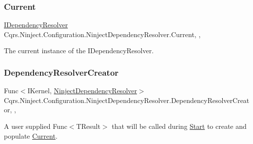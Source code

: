 \subsubsection{\texorpdfstring{Current}{Current}}
{\footnotesize\ttfamily \hyperlink{interfaceCqrs_1_1Configuration_1_1IDependencyResolver}{I\+Dependency\+Resolver} Cqrs.\+Ninject.\+Configuration.\+Ninject\+Dependency\+Resolver.\+Current\hspace{0.3cm}{\ttfamily [static]}, {\ttfamily [get]}, {}}



The current instance of the I\+Dependency\+Resolver. 

\mbox{\label{classCqrs_1_1Ninject_1_1Configuration_1_1NinjectDependencyResolver_a11ea52beeb7420d21c99baeb3501aa0a_a11ea52beeb7420d21c99baeb3501aa0a}} 
\subsubsection{\texorpdfstring{Dependency\+Resolver\+Creator}{DependencyResolverCreator}}
{\footnotesize\ttfamily Func$<$I\+Kernel, \hyperlink{classCqrs_1_1Ninject_1_1Configuration_1_1NinjectDependencyResolver}{Ninject\+Dependency\+Resolver}$>$ Cqrs.\+Ninject.\+Configuration.\+Ninject\+Dependency\+Resolver.\+Dependency\+Resolver\+Creator\hspace{0.3cm}{\ttfamily [static]}, {\ttfamily [get]}, {\ttfamily [set]}}



A user supplied Func$<$\+T\+Result$>$ that will be called during \hyperlink{classCqrs_1_1Ninject_1_1Configuration_1_1NinjectDependencyResolver_adc6171ed45679dcbaa67782770ba5083_adc6171ed45679dcbaa67782770ba5083}{Start} to create and populate \hyperlink{classCqrs_1_1Ninject_1_1Configuration_1_1NinjectDependencyResolver_a2a8ebdf55ecac9eccccc237d422a3f31_a2a8ebdf55ecac9eccccc237d422a3f31}{Current}. 

\mbox{\label{classCqrs_1_1Ninject_1_1Configuration_1_1NinjectDependencyResolver_a507ba37916f7e77cd5bbcc14543c03b5_a507ba37916f7e77cd5bbcc14543c03b5}} 
